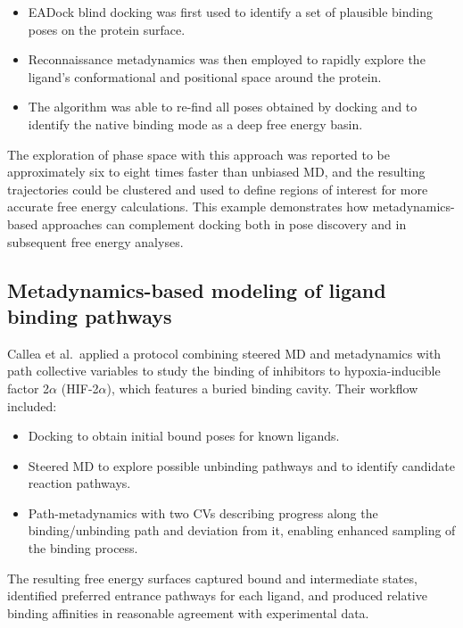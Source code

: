 \documentclass[12pt]{article}
\begin{document}
\begin{itemize}
\item EADock blind docking was first used to identify a set of plausible binding poses on the protein surface.
\item Reconnaissance metadynamics was then employed to rapidly explore the ligand's conformational and positional space around the protein.
\item The algorithm was able to re-find all poses obtained by docking and to identify the native binding mode as a deep free energy basin.
\end{itemize}

The exploration of phase space with this approach was reported to be approximately six to eight times faster than unbiased MD, and the resulting trajectories could be clustered and used to define regions of interest for more accurate free energy calculations.\cite{CH9_soderhjelm2012} This example demonstrates how metadynamics-based approaches can complement docking both in pose discovery and in subsequent free energy analyses.

\subsection{Metadynamics-based modeling of ligand binding pathways}

Callea et al.\ applied a protocol combining steered MD and metadynamics with path collective variables to study the binding of inhibitors to hypoxia-inducible factor 2$\alpha$ (HIF-2$\alpha$), which features a buried binding cavity.\cite{CH9_Callea2021} Their workflow included:

\begin{itemize}
\item Docking to obtain initial bound poses for known ligands.
\item Steered MD to explore possible unbinding pathways and to identify candidate reaction pathways.
\item Path-metadynamics with two CVs describing progress along the binding/unbinding path and deviation from it, enabling enhanced sampling of the binding process.
\end{itemize}

The resulting free energy surfaces captured bound and intermediate states, identified preferred entrance pathways for each ligand, and produced relative binding affinities in reasonable agreement with experimental data.\cite{CH9_Callea2021}
\end{document}
